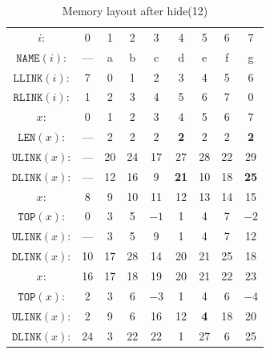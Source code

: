 \documentclass[a4paper,landscape,11pt]{article}
\begin{document}
\begin{table}
	\begin{center}
		\caption{Memory layout after hide(12)}
		\begin{tabular}{c c c c c c c c c }
			\hline
			$i$:                 & 0   & 1          & 2    & 3    & 4           & 5          & 6    & 7           \\
			$\texttt{NAME}(i)$:  & --- & a          & b    & c    & d           & e          & f    & g           \\
			$\texttt{LLINK}(i)$: & 7   & 0          & 1    & 2    & 3           & 4          & 5    & 6           \\
			$\texttt{RLINK}(i)$: & 1   & 2          & 3    & 4    & 5           & 6          & 7    & 0           \\
			\hline
			$x$:                 & 0   & 1          & 2    & 3    & 4           & 5          & 6    & 7           \\
			$\texttt{LEN}(x)$:   & --- & 2          & 2    & 2    & \textbf{2}  & 2          & 2    & \textbf{2}  \\
			$\texttt{ULINK}(x)$: & --- & 20         & 24   & 17   & 27          & 28         & 22   & 29          \\
			$\texttt{DLINK}(x)$: & --- & 12         & 16   & 9    & \textbf{21} & 10         & 18   & \textbf{25} \\
			\hline
			$x$:                 & 8   & 9          & 10   & 11   & 12          & 13         & 14   & 15          \\
			$\texttt{TOP}(x)$:   & 0   & 3          & 5    & $-1$ & 1           & 4          & 7    & $-2$        \\
			$\texttt{ULINK}(x)$: & --- & 3          & 5    & 9    & 1           & 4          & 7    & 12          \\
			$\texttt{DLINK}(x)$: & 10  & 17         & 28   & 14   & 20          & 21         & 25   & 18          \\
			\hline
			$x$:                 & 16  & 17         & 18   & 19   & 20          & 21         & 22   & 23          \\
			$\texttt{TOP}(x)$:   & 2   & 3          & 6    & $-3$ & 1           & 4          & 6    & $-4$        \\
			$\texttt{ULINK}(x)$: & 2   & 9          & 6    & 16   & 12          & \textbf{4} & 18   & 20          \\
			$\texttt{DLINK}(x)$: & 24  & 3          & 22   & 22   & 1           & 27         & 6    & 25          \\

\end{tabular}
\end{center}
\end{table}
\end{document}
